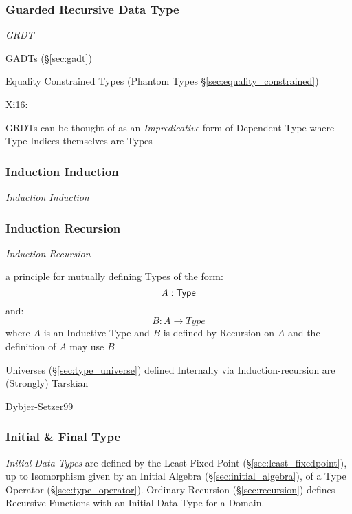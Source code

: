 \subsubsection{Guarded Recursive Data Type}\label{sec:grdt}

\emph{GRDT}

\fist GADTs (\S\ref{sec:gadt})

\fist Equality Constrained Types (Phantom Types
\S\ref{sec:equality_constrained})

Xi16:

GRDTs can be thought of as an \emph{Impredicative} form of Dependent Type where
Type Indices themselves are Types



\subsubsection{Induction Induction}\label{sec:induction_induction}

\emph{Induction Induction}



\subsubsection{Induction Recursion}\label{sec:induction_recursion}

\emph{Induction Recursion}

a principle for mutually defining Types of the form:
\[
  A : \mathsf{Type}
\]
and:
\[
  B : A \rightarrow Type
\]
where $A$ is an Inductive Type and $B$ is defined by Recursion on $A$
and the definition of $A$ may use $B$

Universes (\S\ref{sec:type_universe}) defined Internally via
Induction-recursion are (Strongly) Tarskian

Dybjer-Setzer99



\subsubsection{Initial \& Final Type}\label{sec:initial_final_type}

\emph{Initial Data Types} are defined by the Least Fixed Point
(\S\ref{sec:least_fixedpoint}), up to Isomorphism given by an Initial
Algebra (\S\ref{sec:initial_algebra}), of a Type Operator
(\S\ref{sec:type_operator}). Ordinary Recursion
(\S\ref{sec:recursion}) defines Recursive Functions with an Initial
Data Type for a Domain.

